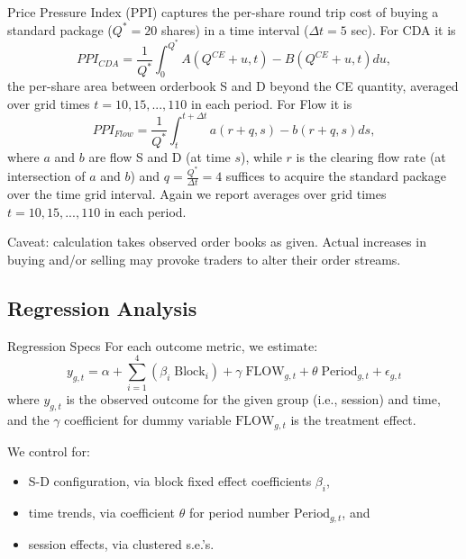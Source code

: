 \documentclass[10pt]{beamer}
\begin{document}
\begin{frame}{Price Pressure Index (PPI)}
captures the per-share round trip  cost of buying a standard package ($Q^*=20$ shares) in a time interval ($\Delta t = 5$ sec). \pause
For CDA it is
\begin{equation} \label{eq:ppicda}
    PPI_{CDA} = \frac{1}{Q^*}\int_0^{Q^*} A(Q^{CE}+u,t) - B(Q^{CE}+u,t) du,
\end{equation}
the per-share area between orderbook S and D beyond the CE quantity, averaged over grid times $t=10, 15, ... , 110$ in each period. \pause
For Flow it is
\begin{equation} \label{eq:ppiflow}
    PPI_{Flow} = \frac{1}{Q^*}\int_t^{t+\Delta t} a(r+q,s) - b(r+q,s) ds,
\end{equation}
where $a$ and $b$ are flow S and D (at time $s$), while $r$ is the clearing flow rate (at intersection of $a$ and $b$) and 
$q=\frac{Q^*}{\Delta t}=4$ suffices to acquire the standard package over the time grid interval. Again we report averages over grid times $t=10, 15, ... , 110$ in each period. \pause

Caveat: calculation takes observed order books as given. Actual increases in buying and/or selling may provoke traders to alter their order streams.
\end{frame}



\subsection{Regression Analysis}

\begin{frame}{Regression Specs}
For each outcome metric, we estimate: 
\begin{equation} \label{eq:reg}
    y_{g,t} = \alpha + \sum^{4}_{i = 1} \left(\beta_i \; \text{Block}_i\right) + \gamma \; \text{FLOW}_{g,t} + \theta \; \text{Period}_{g,t} + \epsilon_{g,t}
\end{equation}
where $y_{g,t}$ is the observed outcome  for the given group (i.e., session) and time, and the $\gamma$ coefficient for dummy variable $\text{FLOW}_{g,t}$ is the treatment effect. \pause

We control for: 
\begin{itemize}
\item S-D configuration, via  block fixed effect coefficients $\beta_i$,  
\item time trends, via coefficient $\theta$ for period number $\text{Period}_{g,t}$, and
\item session effects, via clustered s.e.'s.
\end{itemize} \pause
 
\end{frame}
\end{document}
